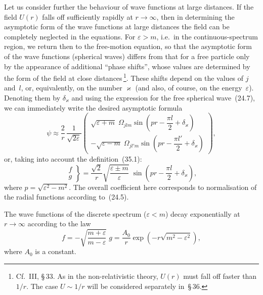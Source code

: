 Let us consider further the behaviour of wave functions at large distances. If the field $U(r)$ falls off sufficiently rapidly at $r\to\infty$, then in determining the asymptotic form of the wave functions at large distances the field can be completely neglected in the equations. For $\varepsilon > m$, i.e.\ in the continuous-spectrum region, we return then to the free-motion equation, so that the asymptotic form of the wave functions (spherical waves) differs from that for a free particle only by the appearance of additional ``phase shifts'', whose values are determined by the form of the field at close distances\,\footnote{Cf.\ III, \S\,33. As in the non-relativistic theory, $U(r)$ must fall off faster than $1/r$. The case $U \sim 1/r$ will be considered separately in~\S\,36.}. These shifts depend on the values of $j$ and~$l$, or, equivalently, on the number $\varkappa$ (and also, of course, on the energy~$\varepsilon$). Denoting them by $\delta_\varkappa$ and using the expression for the free spherical wave~(24.7), we can immediately write the desired asymptotic formula
\begin{equation}
\psi \approx \frac{2}{r}\,\frac{1}{\sqrt{2\varepsilon}}
\begin{pmatrix}
\sqrt{\varepsilon+m}\;\Omega_{jlm}\sin\!\left(pr - \dfrac{\pi l}{2} + \delta_\varkappa\right)\\[6pt]
-\sqrt{\varepsilon-m}\;\Omega_{jl'm}\sin\!\left(pr - \dfrac{\pi l'}{2} + \delta_\varkappa\right)
\end{pmatrix},
\tag{35.7}
\end{equation}
or, taking into account the definition~(35.1):
\begin{equation}
\left.\begin{aligned}
f\\g
\end{aligned}\right\}
= \frac{\sqrt{2}}{r}\sqrt{\frac{\varepsilon\pm m}{\varepsilon}}\;\sin\!\left(pr - \frac{\pi l}{2} + \delta_\varkappa\right),
\tag{35.8}
\end{equation}
where $p = \sqrt{\varepsilon^2 - m^2}$. The overall coefficient here corresponds to normalisation of the radial functions according to~(24.5).

The wave functions of the discrete spectrum ($\varepsilon < m$) decay exponentially at $r\to\infty$ according to the law
\begin{equation}
f = -\sqrt{\frac{m+\varepsilon}{m-\varepsilon}}\;g = \frac{A_0}{r}\exp\!\left(-r\sqrt{m^2 - \varepsilon^2}\right),
\tag{35.9}
\end{equation}
where $A_0$ is a constant.

